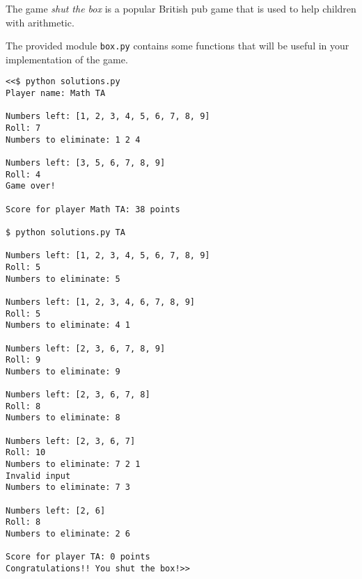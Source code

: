 \begin{problem} %
The game \emph{shut the box} is a popular British pub game that is used to help children with arithmetic.

The provided module \texttt{box.py} contains some functions that will be useful in your implementation of the game.

\begin{lstlisting}
<<$ python solutions.py
Player name: Math TA

Numbers left: [1, 2, 3, 4, 5, 6, 7, 8, 9]
Roll: 7
Numbers to eliminate: 1 2 4

Numbers left: [3, 5, 6, 7, 8, 9]
Roll: 4
Game over!

Score for player Math TA: 38 points

$ python solutions.py TA

Numbers left: [1, 2, 3, 4, 5, 6, 7, 8, 9]
Roll: 5
Numbers to eliminate: 5

Numbers left: [1, 2, 3, 4, 6, 7, 8, 9]
Roll: 5
Numbers to eliminate: 4 1

Numbers left: [2, 3, 6, 7, 8, 9]
Roll: 9
Numbers to eliminate: 9

Numbers left: [2, 3, 6, 7, 8]
Roll: 8
Numbers to eliminate: 8

Numbers left: [2, 3, 6, 7]
Roll: 10
Numbers to eliminate: 7 2 1
Invalid input
Numbers to eliminate: 7 3

Numbers left: [2, 6]
Roll: 8
Numbers to eliminate: 2 6

Score for player TA: 0 points
Congratulations!! You shut the box!>>
\end{lstlisting}
\end{problem}

